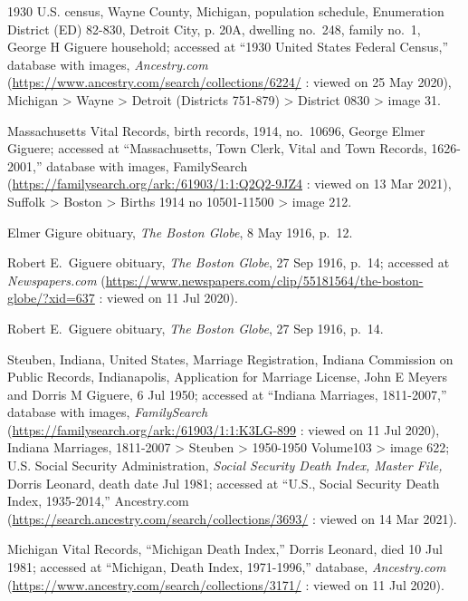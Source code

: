 \begin{thebibliography}{999}
1930 U.S. census, Wayne County, Michigan, population schedule, Enumeration District (ED) 82-830, Detroit City, p. 20A, dwelling no.\ 248, family no.\ 1, George H Giguere household; accessed at ``1930 United States Federal Census,'' database with images, \textit{Ancestry.com} (\url{https://www.ancestry.com/search/collections/6224/} : viewed on 25 May 2020), Michigan > Wayne > Detroit (Districts 751-879) > District 0830 > image 31.

Massachusetts Vital Records, birth records, 1914, no.\ 10696, George Elmer Giguere; accessed at ``Massachusetts, Town Clerk, Vital and Town Records, 1626-2001,'' database with images, FamilySearch (\url{https://familysearch.org/ark:/61903/1:1:Q2Q2-9JZ4} : viewed on 13 Mar 2021), Suffolk > Boston > Births 1914 no 10501-11500 > image 212.

Elmer Gigure obituary, \textit{The Boston Globe}, 8 May 1916, p.\ 12.
	
Robert E.\ Giguere obituary, \textit{The Boston Globe}, 27 Sep 1916, p.\ 14; accessed at \textit{Newspapers.com} (\url{https://www.newspapers.com/clip/55181564/the-boston-globe/?xid=637} : viewed on 11 Jul 2020).

Robert E.\ Giguere obituary, \textit{The Boston Globe}, 27 Sep 1916, p.\ 14.

Steuben, Indiana, United States, Marriage Registration, Indiana Commission on Public Records, Indianapolis, Application for Marriage License, John E Meyers and Dorris M Giguere, 6 Jul 1950; accessed at ``Indiana Marriages, 1811-2007,'' database with images, \textit{FamilySearch} (\url{https://familysearch.org/ark:/61903/1:1:K3LG-899} : viewed on 11 Jul 2020), Indiana Marriages, 1811-2007 > Steuben > 1950-1950 Volume103 > image 622; U.S. Social Security Administration, \textit{Social Security Death Index, Master File,} Dorris Leonard, death date Jul 1981; accessed at ``U.S., Social Security Death Index, 1935-2014,'' Ancestry.com (\url{https://search.ancestry.com/search/collections/3693/} : viewed on 14 Mar 2021).

Michigan Vital Records, ``Michigan Death Index,'' Dorris Leonard, died 10 Jul 1981; accessed at ``Michigan, Death Index, 1971-1996,'' database, \textit{Ancestry.com} (\url{https://www.ancestry.com/search/collections/3171/} : viewed on 11 Jul 2020).


\end{thebibliography}
